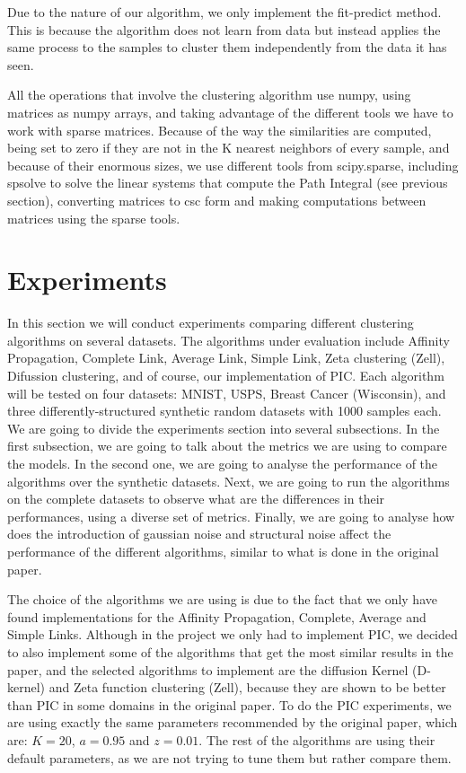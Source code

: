 \documentclass[
	10pt,
	parskip=half-,	
	paper=a4,
	english
	]{scrartcl}
\begin{document}
Due to the nature of our algorithm, we only implement the fit-predict method. This is because the algorithm does not learn from data but instead applies the same process to the samples to cluster them independently from the data it has seen.

All the operations that involve the clustering algorithm use numpy, using matrices as numpy arrays, and taking advantage of the different tools we have to work with sparse matrices. Because of the way the similarities are computed, being set to zero if they are not in the K nearest neighbors of every sample, and because of their enormous sizes, we use different tools from scipy.sparse, including spsolve to solve the linear systems that compute the Path Integral (see previous section), converting matrices to csc form and making computations between matrices using the sparse tools.

\section {Experiments}

In this section we will conduct experiments comparing different clustering algorithms on several datasets. The algorithms under evaluation include Affinity Propagation, Complete Link, Average Link, Simple Link, Zeta clustering (Zell), Difussion clustering, and of course, our implementation of PIC. Each algorithm will be tested on four datasets: MNIST, USPS, Breast Cancer (Wisconsin), and three differently-structured synthetic random datasets with 1000 samples each. We are going to divide the experiments section into several subsections. In the first subsection, we are going to talk about the metrics we are using to compare the models. In the second one, we are going to analyse the performance of the algorithms over the synthetic datasets. Next, we are going to run the algorithms on the complete datasets to observe what are the differences in their performances, using a diverse set of metrics. Finally, we are going to analyse how does the introduction of gaussian noise and structural noise affect the performance of the different algorithms, similar to what is done in the original paper.

The choice of the algorithms we are using is due to the fact that we only have found implementations for the Affinity Propagation, Complete, Average and Simple Links. Although in the project we only had to implement PIC, we decided to also implement some of the algorithms that get the most similar results in the paper, and the selected algorithms to implement are the diffusion Kernel (D-kernel) and Zeta function clustering (Zell), because they are shown to be better than PIC in some domains in the original paper. To do the PIC experiments, we are using exactly the same parameters recommended by the original paper, which are: \(K=20\), \(a=0.95\) and \(z=0.01\). The rest of the algorithms are using their default parameters, as we are not trying to tune them but rather compare them.
\end{document}
